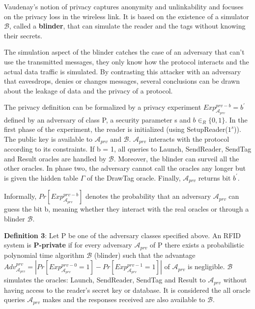     Vaudenay's notion of privacy captures anonymity and unlinkability and focuses on the privacy loss in the wireless link. It is based on 
    the existence of a simulator $\mathcal{B}$, called a \textbf{blinder}, that can simulate the reader and the tags without knowing their secrets.
    
    The simulation aspect of the blinder catches the case of an adversary that can't use the transmitted messages, they only know how the protocol
    interacts and the actual data traffic is simulated. By contrasting this attacker with an adversary that eavesdrops, denies or changes messages,
    several conclusions can be drawn about the leakage of data and the privacy of a protocol.

    The privacy definition can be formalized by a privacy experiment $Exp_{\mathcal{A}_{prv}}^{prv-b} = b^{'}$ defined by an adversary of class P, a
    security parameter s and $b \in_{R} \{0,1\}$. In the first phase of the experiment, the reader is initialized (using SetupReader($1^s$)). 
    The public key is available to $\mathcal{A}_{prv}$ and $\mathcal{B}$. $\mathcal{A}_{prv}$ interacts with the protocol according to its constraints.
    If b = 1, all queries to Launch, SendReader, SendTag and Result oracles are handled by $\mathcal{B}$. Moreover, the blinder can surveil all the other
    oracles. In phase two, the adversary cannot call the oracles any longer but is given the hidden table $\Gamma$ of the DrawTag oracle. Finally, 
    $\mathcal{A}_{prv}$ returns bit $b^{'}$.

    Informally, $Pr[Exp_{\mathcal{A}_{prv}}^{prv-b}]$ denotes the probability that an adversary $\mathcal{A}_{prv}$
    can guess the bit b, meaning whether they interact with the real oracles or through a blinder $\mathcal{B}$.

    \textbf{Definition 3}: Let P be one of the adversary classes specified above. An RFID system is \textbf{P-private} if for
    every adversary $\mathcal{A}_{prv}$ of P there exists a probabilistic polynomial time algorithm $\mathcal{B}$ 
    (blinder) such that the advantage $Adv_{\mathcal{A}_{prv}}^{prv} = | Pr[Exp_{\mathcal{A}_{prv}}^{prv-0} = 1] - Pr[Exp_{\mathcal{A}_{prv}}^{prv-1} = 1] |$ 
    of $\mathcal{A}_{prv}$ is negligible. $\mathcal{B}$ simulates the oracles: Launch, SendReader, SendTag and
    Result to $\mathcal{A}_{prv}$ without having access to the reader's secret key or database. It is considered the all
    oracle queries $\mathcal{A}_{prv}$ makes and the responses received are also available to $\mathcal{B}$.

